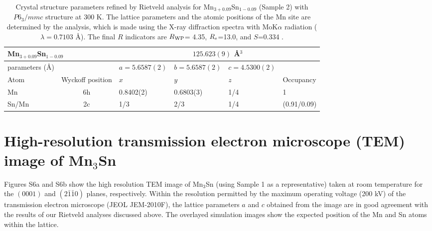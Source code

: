 \documentclass[amsmath,amssymb]{nature}
\begin{document}
	\begin{table*}[b]
		\caption{\label{tab:table1}  Crystal structure parameters refined by Rietveld analysis for Mn$_{3+0.09}$Sn$_{1-0.09}$ (Sample 2) with $P6_3/mmc$ structure at 300 K. The lattice parameters and the atomic positions of the Mn site are determined by the analysis, which is made using the X-ray diffraction spectra with MoK$\alpha$ radiation ($\lambda = 0.7103$ \AA). The final $R$ indicators are $R_{\rm WP}$= 4.35, $R_{\rm e}$=13.0, and $S$=0.334 \cite{izumi2007}.}
		
		\begin{tabular}{lrllll}
			\multicolumn{2}{l}{Mn$_{3+0.09}$Sn$_{1-0.09}$} &\multicolumn{4}{c}{$125.623(9)$ \AA $^3$} \\
			\hline\hline
			\multicolumn{1}{l}{parameters  (\AA)} &\multicolumn{1}{c}{} & \multicolumn{1}{c}{$a=5.6587(2)$} & \multicolumn{1}{c}{$b=5.6587(2)$} & \multicolumn{1}{c}{ $c=4.5300(2)$}&\multicolumn{1}{c}{} \\
			\hline
			\multicolumn{1}{l}{ Atom                    } &\multicolumn{1}{c}{Wyckoff position} & $x$ & $y$ &  $z$& Occupancy\\
			\multicolumn{1}{l}{ Mn                   } &\multicolumn{1}{c}{6h} &  0.8402(2) &  0.6803(3) &   1/4& 1\\
			\multicolumn{1}{l}{ Sn/Mn               } &\multicolumn{1}{c}{2c} &  1/3 &  2/3 &   1/4& (0.91/0.09)\\
			\hline\hline
		\end{tabular}
		\label{tab:Ret}
		
	\end{table*}
	
	
	
\section{High-resolution transmission electron microscope (TEM) image of Mn$_{3}$Sn}   Figures S6a and S6b show the high resolution TEM image of Mn$_{3}$Sn (using Sample 1 as a representative) taken at room temperature for the $(0001)$ and $(2\bar{1}\bar{1}0)$ planes, respectively. Within the resolution permitted by the maximum operating voltage (200 kV) of the transmission electron microscope (JEOL JEM-2010F), the lattice parameters $a$ and $c$ obtained from the image are in good agreement with the results of our Rietveld analyses discussed above. The overlayed simulation images show the expected position of the Mn and Sn atoms within the lattice.
	
\end{document}
